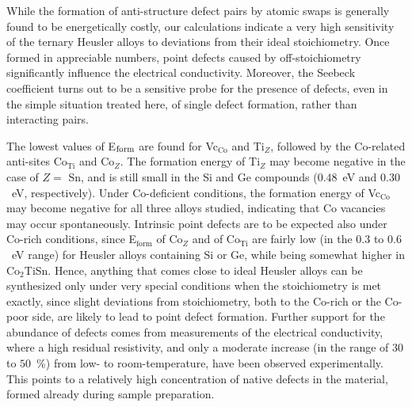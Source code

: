 \documentclass[aps,prb,twocolumn,superscriptaddress,showpacs]{revtex4}
\begin{document}
While the formation of anti-structure defect pairs by atomic swaps is
generally found to be energetically costly, our calculations indicate
a very high sensitivity of the ternary Heusler alloys to deviations
from their ideal stoichiometry. Once formed in appreciable numbers,
point defects caused by off-stoichiometry significantly influence the
electrical conductivity. Moreover, the Seebeck coefficient turns out
to be  a sensitive probe for the presence of defects,
even in the simple situation treated here, of
single defect formation, rather than interacting pairs.



The lowest values of E$_{\rm form}$ are found  for Vc$_\text{Co}$ and
Ti$_Z$, followed by the Co-related anti-sites Co$_\text{Ti}$ and
Co$_Z$.  The formation energy of Ti$_Z$ may become negative
in the case of $Z=$ Sn, and is still small in the Si and Ge compounds
($0.48$~eV and $0.30$~eV, respectively). 
Under Co-deficient conditions, the formation energy of 
Vc$_\text{Co}$ may become negative
for all three alloys studied, 
indicating that Co vacancies may occur spontaneously.
Intrinsic point defects are to be
expected also under Co-rich conditions, 
since E$_\text{form}$ of Co$_Z$ and of Co$_\text{Ti}$ are
fairly low (in the $0.3$ to $0.6$~eV range) for Heusler alloys containing
Si or Ge, while being somewhat higher in Co$_2$TiSn. Hence,
anything that comes close to
ideal Heusler alloys can be synthesized only under very special
conditions when the stoichiometry is met exactly, since slight
deviations from stoichiometry, both to the Co-rich or the Co-poor
side, are likely to lead to point defect formation. 
Further support for the abundance of defects  comes from measurements 
of the electrical conductivity, where a high residual resistivity, 
and only a moderate increase (in the range of $30$ to $50$~\%) 
from low- to room-temperature, have been
observed experimentally.\cite{BFB+10} This points to a relatively high 
concentration of native defects in the material, formed already
during sample preparation. 
\end{document}
